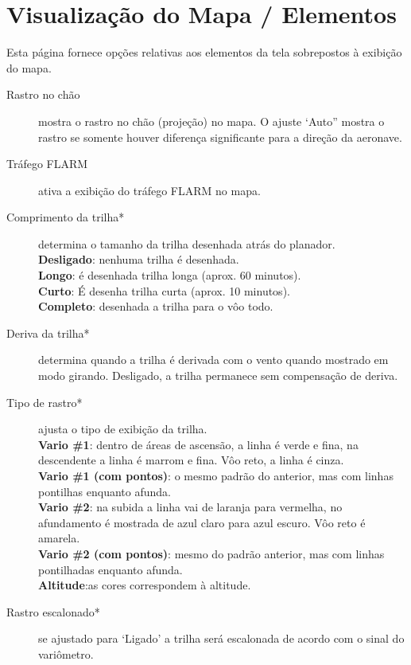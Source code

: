 \section{Visualização do Mapa / Elementos}\label{sec:map-elements}

Esta página fornece opções relativas aos elementos da tela sobrepostos à exibição do mapa.

\begin{description}
\item[Rastro no chão]  mostra o rastro no chão (projeção) no mapa.  O ajuste ‘Auto” mostra o rastro se somente houver diferença significante para a direção da aeronave.
\item[Tráfego FLARM]  \label{conf:flarm-on-map} ativa a exibição do tráfego FLARM no mapa.
\item[Comprimento da trilha*] \label{conf:snailtrail} determina o tamanho da trilha desenhada atrás do planador. \\
  {\bf Desligado}: nenhuma trilha é desenhada. \\
  {\bf Longo}: é desenhada trilha longa (aprox. 60 minutos). \\
  {\bf Curto}: É desenha trilha curta (aprox. 10 minutos). \\
  {\bf Completo}: desenhada a trilha para o vôo todo.
\item[Deriva da trilha*] \label{conf:traildrift} determina quando a trilha é derivada com o vento quando mostrado em modo girando.  Desligado, a trilha permanece sem compensação de deriva.
\item[Tipo de rastro*] \label{conf:snailtype} ajusta o tipo de exibição da trilha. \\
  {\bf Vario \#1}: dentro de áreas de ascensão, a linha é verde e fina, na descendente a linha é marrom e fina.  Vôo reto, a linha é cinza. \\
  {\bf Vario \#1 (com pontos)}: o mesmo padrão do anterior, mas com linhas pontilhas enquanto afunda. \\
  {\bf Vario \#2}: na subida a linha vai de laranja para vermelha, no afundamento é mostrada de azul claro para azul escuro.  Vôo reto é amarela. \\
  {\bf Vario \#2 (com pontos)}: mesmo do padrão anterior, mas com linhas pontilhadas enquanto afunda. \\
  {\bf Altitude}:as cores correspondem à altitude.
\item[Rastro escalonado*] \label{conf:trailscaled} se ajustado para ‘Ligado’ a trilha será escalonada de acordo com o sinal do variômetro.

\end{description}
